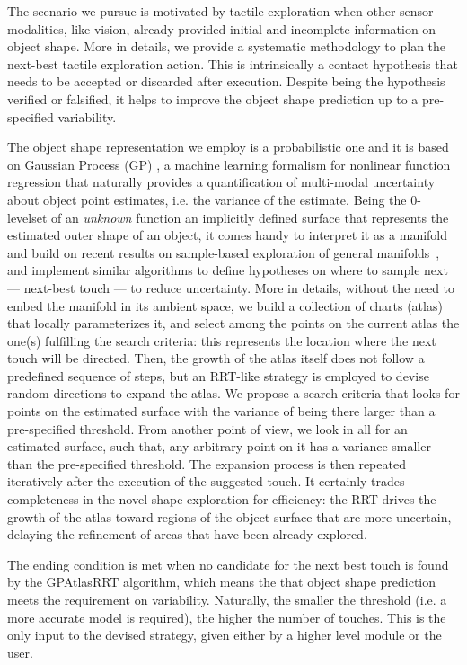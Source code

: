 The scenario we pursue is motivated by tactile exploration when other sensor modalities, like vision, already provided initial and incomplete information on object shape. More in details, we provide a systematic methodology to plan the next-best tactile exploration action. This is intrinsically a contact hypothesis that needs to be accepted or discarded after execution. Despite being the hypothesis verified or falsified, it helps to improve the object shape prediction up to a pre-specified variability.

The object shape representation we employ is a probabilistic one and it is based on Gaussian Process (GP) \citep{Rasmussen2006Gaussian}, a machine learning formalism for nonlinear function regression that naturally provides a quantification of multi-modal uncertainty about object point estimates, i.e. the variance of the estimate. Being the $0$-levelset of an \emph{unknown} function an implicitly defined surface that represents the estimated outer shape of an object, it comes handy to interpret it as a manifold and build on recent results on sample-based exploration of general manifolds~\citep{Jaillet2013Path}, and implement similar algorithms to define hypotheses on where to sample next --- next-best touch --- to reduce uncertainty. More in details, without the need to embed the manifold in its ambient space, we build a collection of charts (atlas) that locally parameterizes it, and select among the points on the current atlas the one(s) fulfilling the search criteria: this represents the location where the next touch will be directed. Then, the growth of the atlas itself does not follow a predefined sequence of steps, but an RRT-like strategy is employed to devise random directions to expand the atlas.
We propose a search criteria that looks for points on the estimated surface with the variance of being there larger than a pre-specified threshold. From another point of view, we look in all for an estimated surface, such that, any arbitrary point on it has a variance smaller than the pre-specified threshold. The expansion process is then repeated iteratively after the execution of the suggested touch.
It certainly trades completeness in the novel shape exploration for efficiency: the RRT drives the growth of the atlas toward  regions of the object surface that are more uncertain, delaying the refinement of areas that have been already explored.

The ending condition is met when no candidate for the next best touch is found by the GPAtlasRRT algorithm, which means the that object shape prediction meets the requirement on variability.
Naturally, the smaller the threshold (i.e. a more accurate model is required), the higher the number of touches. This is the only input to the devised strategy, given either by a higher level module or the user.

